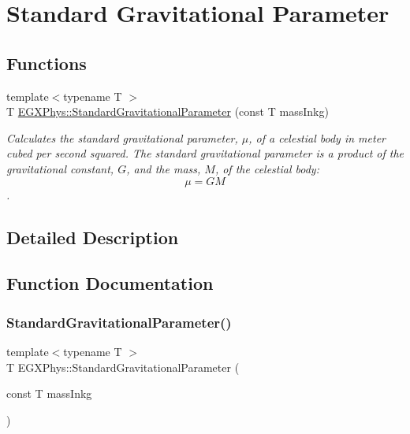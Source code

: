 \hypertarget{group___e_g_x_phys-_astrophysics-_standard_gravitational_parameter}{}\section{Standard Gravitational Parameter}
\label{group___e_g_x_phys-_astrophysics-_standard_gravitational_parameter}
\subsection*{Functions}
\begin{DoxyCompactItemize}
\item 
{\footnotesize template$<$typename T $>$ }\\T \mbox{\hyperlink{group___e_g_x_phys-_astrophysics-_standard_gravitational_parameter_ga37f4ed78b0fc23603b49ade3e435ea20}{E\+G\+X\+Phys\+::\+Standard\+Gravitational\+Parameter}} (const T mass\+Inkg)
\begin{DoxyCompactList}\small\item\em Calculates the standard gravitational parameter, $\mu$, of a celestial body in meter cubed per second squared. The standard gravitational parameter is a product of the gravitational constant, $G$, and the mass, $M$, of the celestial body\+: \[\mu = GM\]. \end{DoxyCompactList}\end{DoxyCompactItemize}


\subsection{Detailed Description}


\subsection{Function Documentation}
\mbox{\label{group___e_g_x_phys-_astrophysics-_standard_gravitational_parameter_ga37f4ed78b0fc23603b49ade3e435ea20}} 
\subsubsection{\texorpdfstring{Standard\+Gravitational\+Parameter()}{StandardGravitationalParameter()}}
{\footnotesize\ttfamily template$<$typename T $>$ \\
T E\+G\+X\+Phys\+::\+Standard\+Gravitational\+Parameter (\begin{DoxyParamCaption}\item[{const T}]{mass\+Inkg }\end{DoxyParamCaption})}



